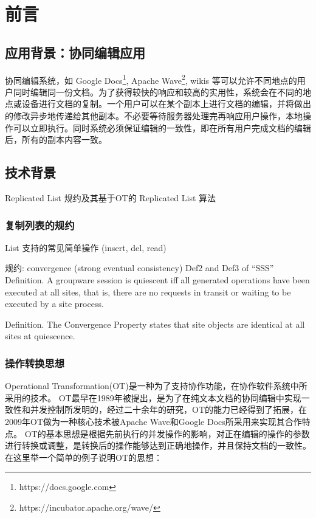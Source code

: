 \chapter{前言}
\section{应用背景：协同编辑应用}
	\par 协同编辑系统，如 Google Docs\footnote{https://docs.google.com}, Apache Wave\footnote{https://incubator.apache.org/wave/}, wikis \cite{citeulike:1087263} 等可以允许不同地点的用户同时编辑同一份文档。为了获得较快的响应和较高的实用性，系统会在不同的地点或设备进行文档的复制。一个用户可以在某个副本上进行文档的编辑，并将做出的修改异步地传递给其他副本。不必要等待服务器处理完再响应用户操作，本地操作可以立即执行。同时系统必须保证编辑的一致性，即在所有用户完成文档的编辑后，所有的副本内容一致。

\section{技术背景}

Replicated List 规约及其基于OT的 Replicated List 算法

\subsection{复制列表的规约}
List 支持的常见简单操作 (insert, del, read)

规约: convergence (strong eventual consistency)
Def2 and Def3 of ``SSS''
Definition. A groupware session is quiescent iff all generated
operations have been executed at all sites, that is, there
are no requests in transit or waiting to be executed by a
site process.\cite{ellis1989concurrency}

Definition. The Convergence Property states that site objects
are identical at all sites at quiescence.\cite{ellis1989concurrency}

\subsection{操作转换思想}
Operational Transformation(OT)是一种为了支持协作功能，在协作软件系统中所采用的技术。
OT最早在1989年被提出，是为了在纯文本文档的协同编辑中实现一致性和并发控制所发明的，经过二十余年的研究，OT的能力已经得到了拓展，在2009年OT做为一种核心技术被Apache Wave和Google Docs所采用来实现其合作特点。
OT的基本思想是根据先前执行的并发操作的影响，对正在编辑的操作的参数进行转换或调整，是转换后的操作能够达到正确地操作，并且保持文档的一致性。
在这里举一个简单的例子说明OT的思想：

